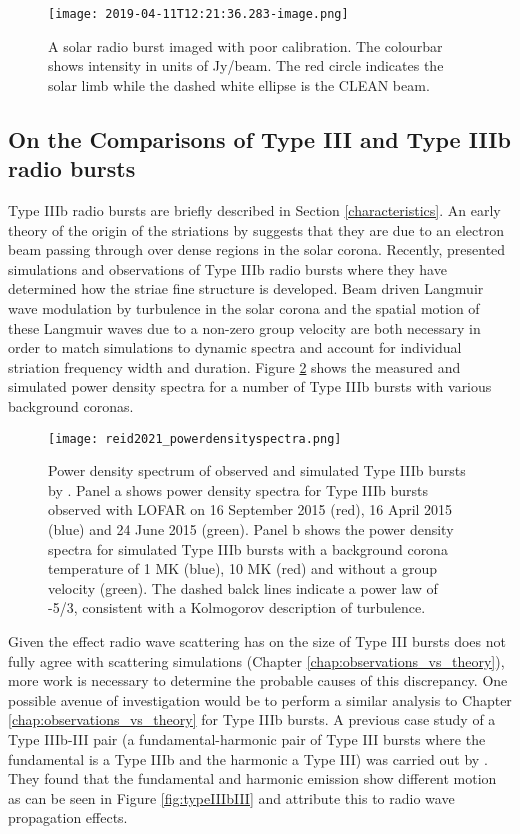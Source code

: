 \begin{figure}[ht]
\centering
\texttt{[image: 2019-04-11T12:21:36.283-image.png]}
\caption[An example of a solar radio burst imaged with poor calibration.]{A solar radio burst imaged with poor calibration. The colourbar shows intensity in units of Jy/beam. The red circle indicates the solar limb while the dashed white ellipse is the CLEAN beam.}
\label{fig:bad_cal}
\end{figure}

\subsection{On the Comparisons of Type III and Type IIIb radio bursts}
Type IIIb radio bursts are briefly described in Section \ref{characteristics}. An early theory of the origin of the striations by \cite{Takakura1975} suggests that they are due to an electron beam passing through over dense regions in the solar corona. Recently, \cite{Reid2021} presented simulations and observations of Type IIIb radio bursts where they have determined how the striae fine structure is developed. Beam driven Langmuir wave modulation by turbulence in the solar corona and the spatial motion of these Langmuir waves due to a non-zero group velocity are both necessary in order to match simulations to dynamic spectra and account for individual striation frequency width and duration. Figure \ref{fig:reid_pds} shows the measured and simulated power density spectra for a number of Type IIIb bursts with various background coronas.

\begin{figure}
\centering
\texttt{[image: reid2021\_powerdensityspectra.png]}
\caption[Power density spectrum of observed and simulated Type IIIb bursts by \cite{Reid2021}]{Power density spectrum of observed and simulated Type IIIb bursts by \cite{Reid2021}. Panel a shows power density spectra for Type IIIb bursts observed with LOFAR on 16 September 2015 (red), 16 April 2015 (blue) and 24 June 2015 (green). Panel b shows the power density spectra for simulated Type IIIb bursts with a background corona temperature of 1 MK (blue), 10 MK (red) and without a group velocity (green). The dashed balck lines indicate a power law of -5/3, consistent with a Kolmogorov description of turbulence.}
\label{fig:reid_pds}
\end{figure}

Given the effect radio wave scattering has on the size of Type III bursts does not fully agree with scattering simulations (Chapter \ref{chap:observations_vs_theory}), more work is necessary to determine the probable causes of this discrepancy. One possible avenue of investigation would be to perform a similar analysis to Chapter \ref{chap:observations_vs_theory} for Type IIIb bursts. A previous case study of a Type IIIb-III pair (a fundamental-harmonic pair of Type III bursts where the fundamental is a Type IIIb and the harmonic a Type III) was carried out by \cite{Zhang2020}. They found that the fundamental and harmonic emission show different motion as can be seen in Figure \ref{fig:typeIIIbIII} and attribute this to radio wave propagation effects.

